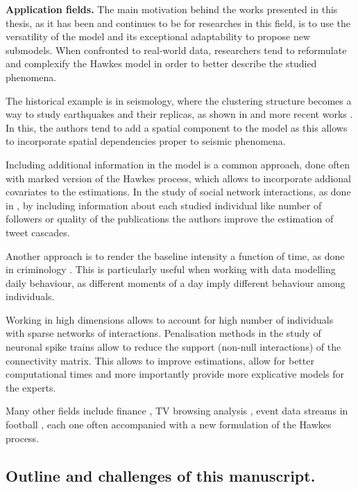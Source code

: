     \textbf{Application fields.}
    The main motivation behind the works presented in this thesis, as it has been and continues to be for researches in this field,
    is to use the versatility of the model and its exceptional adaptability to propose new submodels.
    When confronted to real-world data, 
    researchers tend to reformulate and complexify the Hawkes model in order to better describe the studied phenomena. 
    
    The historical example is in seismology, 
    where the clustering structure becomes a way to study earthquakes and their replicas, as shown in \textcite{Adamopoulos1976,Ogata1988, Ogata1998} and more recent works \parencite{Kwon2023}.
    In this, the authors tend to add a spatial component to the model as this allows to incorporate spatial dependencies proper to seismic phenomena.

    Including additional information in the model is a common approach, done often with marked version of the Hawkes process,
    which allows to incorporate addional covariates to the estimations. 
    In the study of social network interactions, as done in \textcite{Mishra2016,Rizoiu2017},
    by including information about each studied individual like number of followers or quality of the publications the authors improve the estimation of tweet cascades.

    Another approach is to render the baseline intensity a function of time, 
    as done in criminology \textcite{Lewis2011, Olinde2020}.
    This is particularly useful when working with data modelling daily behaviour, as different moments of a day imply different behaviour among individuals.

    Working in high dimensions allows to account for high number of individuals with sparse networks of interactions.
    Penalisation methods in the study of neuronal spike trains \parencite{Reynaud2013, Lambert2018}
    allow to reduce the support (non-null interactions) of the connectivity matrix.
    This allows to improve estimations, allow for better computational times and more importantly provide more explicative models for the experts.

    Many other fields include finance \parencite{Embrechts2011, Bacry2013, Lotz2024}, TV browsing analysis \parencite{Xu2016}, event data streams in football \parencite{Baouan2023, Narayanan2023}, 
    each one often accompanied with a new formulation of the Hawkes process.

    \subsection{Outline and challenges of this manuscript.}\label{sec:chap0_outline}

